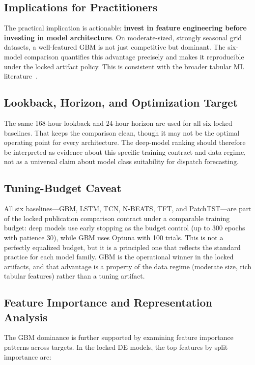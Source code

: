 \documentclass[11pt,a4paper]{article}
\begin{document}
\subsection{Implications for Practitioners}

The practical implication is actionable: \textbf{invest in feature engineering before investing in model architecture}. On moderate-sized, strongly seasonal grid datasets, a well-featured GBM is not just competitive but dominant. The six-model comparison quantifies this advantage precisely and makes it reproducible under the locked artifact policy. This is consistent with the broader tabular ML literature~\cite{borisov2022deep}.

\subsection{Lookback, Horizon, and Optimization Target}

The same 168-hour lookback and 24-hour horizon are used for all six locked baselines. That keeps the comparison clean, though it may not be the optimal operating point for every architecture. The deep-model ranking should therefore be interpreted as evidence about this specific training contract and data regime, not as a universal claim about model class suitability for dispatch forecasting.

\subsection{Tuning-Budget Caveat}

All six baselines---GBM, LSTM, TCN, N-BEATS, TFT, and PatchTST---are part of the locked publication comparison contract under a comparable training budget: deep models use early stopping as the budget control (up to 300 epochs with patience 30), while GBM uses Optuna with 100 trials. This is not a perfectly equalized budget, but it is a principled one that reflects the standard practice for each model family. GBM is the operational winner in the locked artifacts, and that advantage is a property of the data regime (moderate size, rich tabular features) rather than a tuning artifact.

\subsection{Feature Importance and Representation Analysis}

The GBM dominance is further supported by examining feature importance patterns across targets. In the locked DE models, the top features by split importance are:
\end{document}
